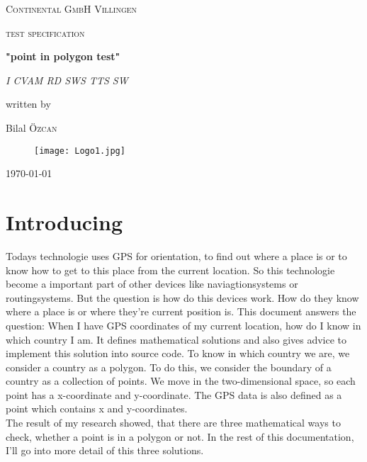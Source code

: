 \documentclass[12pt,a4paper]{scrreprt}
\begin{document}
\begin{titlepage}

	\centering
	{\scshape\LARGE Continental GmbH Villingen \par}
	\vspace{2cm}
	{\scshape\Large test specification \par}
	\vspace{1.5cm}
	{\huge\bfseries "point in polygon test"\par}
	\vspace{2cm}
	{\Large\itshape I CVAM RD SWS TTS SW \par}
	\vfill
	written by\par
	Bilal \textsc{Özcan}

	\vfill
	\begin{figure}
	\centering
	\texttt{[image: Logo1.jpg]}
	\vspace{1cm}
	\end{figure}

	{\large \today\par}
	\end{titlepage}

	\newpage
	
\chapter*{Introducing}
\begin{flushleft}
Todays technologie uses GPS for orientation, to find out where a place is or to know how to get to this place from the current location. So this technologie become a important part of other devices like naviagtionsystems or routingsystems. But the question is how do this devices work. How do they know where a place is or where they're current position is. This document answers the question: When I have GPS coordinates of my current location, how do I know in which country I am. It defines mathematical solutions and also gives advice to implement this solution into source code. To know in which country we are, we consider a country as a polygon. To do this, we consider the boundary of a country as a collection of points. We move in the two-dimensional space, so each point has a x-coordinate and y-coordinate. The GPS data is also defined as a point which contains x and y-coordinates.\\
\vspace{0.5cm}
The result of my research showed, that there are three mathematical ways to check, whether a point is in a polygon or not. In the rest of this documentation, I'll go into more detail of this three solutions.



\end{flushleft}
\end{document}
